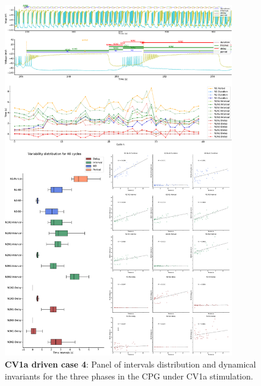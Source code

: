 \begin{figure}[htbp]
	\centering
	\includegraphics[width=0.9\textwidth]{./invariants/data/SUSSEX/CV1a_driven4/images/3phases/panel_with_intervals.pdf}
	\caption{\textbf{CV1a driven case 4}: Panel of intervals distribution and dynamical invariants for the three phases in the CPG under CV1a stimulation.}
	\label{fig:cv1a 4 3phases}
\end{figure}

